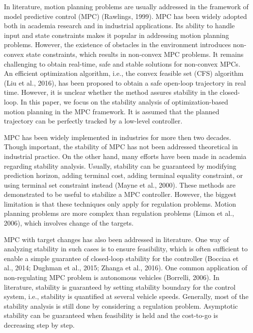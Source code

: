\documentclass{ifacconf}
\begin{document}
In literature, motion planning problems are usually addressed in the framework of model predictive control (MPC) (Rawlings, 1999). MPC has been widely adopted both in academia research and in industrial applications. Its ability to handle input and state constraints makes it popular in addressing motion planning problems. However, the existence of obstacles in the environment introduces non-convex state constraints, which results in non-convex MPC problems. It remains challenging to obtain real-time, safe and stable solutions for non-convex MPCs. An efficient optimization algorithm, i.e., the convex feasible set (CFS) algorithm (Liu et al., 2016), has been proposed to obtain a safe open-loop trajectory in real time. However, it is unclear whether the method assures stability in the closed-loop.
In this paper, we focus on the stability analysis of optimization-based motion planning in the MPC framework. It is assumed that the planned trajectory can be perfectly tracked by a low-level controller.


MPC has been widely implemented in industries for more then two decades. Though important, the stability of MPC has not been addressed theoretical in industrial practice. On the other hand, many efforts have been made in academia regarding stability analysis. Usually, stability can be guaranteed by modifying prediction horizon, adding terminal cost, adding terminal equality constraint, or using terminal set constraint instead (Mayne et al., 2000). These methods are demonstrated to be useful to stabilize a MPC controller. However, the biggest limitation is that these techniques only apply for regulation problems. Motion planning problems are more complex than regulation problems (Limon et al., 2006), which involves change of the targets. 

MPC with target changes has also been addressed in literature. One way of analyzing stability in such cases is to ensure feasibility, which is often sufficient to enable a simple guarantee of closed-loop stability for the controller (Bocciaa et al., 2014; Dughman et al., 2015; Zhanga et al., 2016). One common application of non-regulating MPC problem is autonomous vehicles (Borrelli, 2006). In literature, stability is guaranteed by setting stability boundary for the control system, i.e., stability is quantified at several vehicle speeds. Generally, most of the stability analysis is still done by considering a regulation problem. Asymptotic stability can be guaranteed when feasibility is held and the cost-to-go is decreasing step by step.
\end{document}

